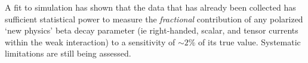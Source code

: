 


A fit to simulation has shown that the data that has already been collected has sufficient statistical power to measure the \emph{fractional} contribution of any polarized `new physics' beta decay parameter (ie right-handed, scalar, and tensor currents within the weak interaction) to a sensitivity of $\sim 2\%$ of its true value.  Systematic limitations are still being assessed.  



